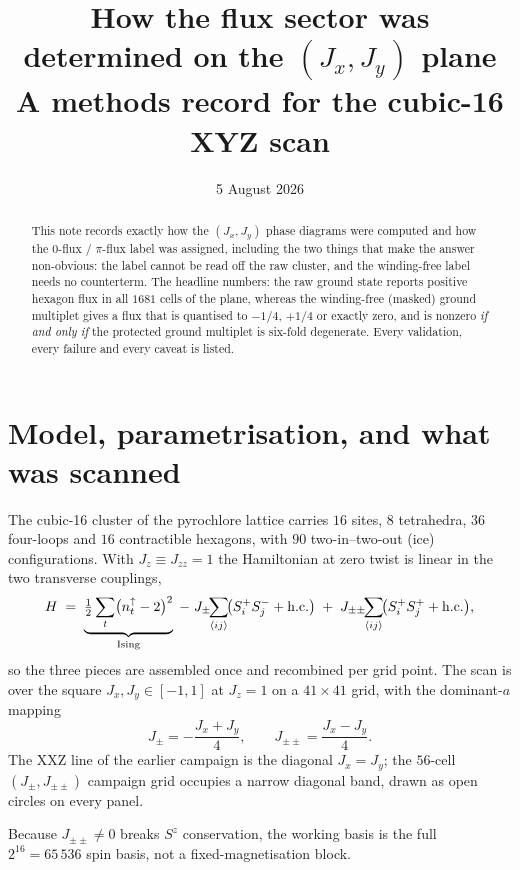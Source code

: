 \documentclass[11pt]{article}
\title{How the flux sector was determined on the $(J_x,J_y)$ plane\\
\large A methods record for the cubic-16 XYZ scan}
\author{}
\date{5 August 2026}
\newcommand{\Jzz}{J_{zz}}
\newcommand{\Jpm}{J_{\pm}}
\newcommand{\Jpmpm}{J_{\pm\pm}}
\begin{document}
\maketitle

\begin{abstract}
\noindent
This note records exactly how the $(J_x,J_y)$ phase diagrams were computed
and how the $0$-flux / $\pi$-flux label was assigned, including the two
things that make the answer non-obvious: the label cannot be read off the
raw cluster, and the winding-free label needs no counterterm.  The headline
numbers: the raw ground state reports positive hexagon flux in all $1681$
cells of the plane, whereas the winding-free (masked) ground multiplet
gives a flux that is quantised to $-1/4$, $+1/4$ or exactly zero, and is
nonzero \emph{if and only if} the protected ground multiplet is six-fold
degenerate.  Every validation, every failure and every caveat is listed.
\end{abstract}

\section{Model, parametrisation, and what was scanned}

The cubic-16 cluster of the pyrochlore lattice carries $16$ sites, $8$
tetrahedra, $36$ four-loops and $16$ contractible hexagons, with $90$
two-in--two-out (ice) configurations.  With $J_z\equiv\Jzz=1$ the
Hamiltonian at zero twist is linear in the two transverse couplings,
\begin{equation}
H \;=\; \underbrace{\tfrac12\sum_t \bigl(n^{\uparrow}_t-2\bigr)^2}_{\text{Ising}}
\;-\;\Jpm\!\!\sum_{\langle ij\rangle}\!\bigl(S^+_iS^-_j+{\rm h.c.}\bigr)
\;+\;\Jpmpm\!\!\sum_{\langle ij\rangle}\!\bigl(S^+_iS^+_j+{\rm h.c.}\bigr),
\label{eq:H}
\end{equation}
so the three pieces are assembled once and recombined per grid point.  The
scan is over the square $J_x,J_y\in[-1,1]$ at $J_z=1$ on a $41\times41$
grid, with the dominant-$a$ mapping
\begin{equation}
\Jpm=-\frac{J_x+J_y}{4},\qquad \Jpmpm=\frac{J_x-J_y}{4}.
\label{eq:map}
\end{equation}
The XXZ line of the earlier campaign is the diagonal $J_x=J_y$; the
$56$-cell $(\Jpm,\Jpmpm)$ campaign grid occupies a narrow diagonal band,
drawn as open circles on every panel.

Because $\Jpmpm\neq0$ breaks $S^z$ conservation, the working basis is the
full $2^{16}=65\,536$ spin basis, not a fixed-magnetisation block.
\end{document}
